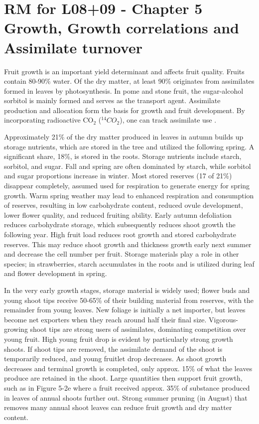 \section{RM for L08+09 - Chapter 5 Growth, Growth correlations and Assimilate turnover}

Fruit growth is an important yield determinant and affects fruit quality. Fruits contain 80-90\% water. Of the dry matter, at least 90\% originates from assimilates formed in leaves by photosynthesis. In pome and stone fruit, the sugar-alcohol sorbitol is mainly formed and serves as the transport agent. Assimilate production and allocation form the basis for growth and fruit development. By incorporating radioactive CO$_2$ ($^{14}CO_2$), one can track assimilate use \cite*{rm_06_L08_growth}.

\vspace{0.5em}
Approximately 21\% of the dry matter produced in leaves in autumn builds up storage nutrients, which are stored in the tree and utilized the following spring. A significant share, 18\%, is stored in the roots. Storage nutrients include starch, sorbitol, and sugar. Fall and spring are often dominated by starch, while sorbitol and sugar proportions increase in winter. Most stored reserves (17 of 21\%) disappear completely, assumed used for respiration to generate energy for spring growth. Warm spring weather may lead to enhanced respiration and consumption of reserves, resulting in low carbohydrate content, reduced ovule development, lower flower quality, and reduced fruiting ability. Early autumn defoliation reduces carbohydrate storage, which subsequently reduces shoot growth the following year. High fruit load reduces root growth and stored carbohydrate reserves. This may reduce shoot growth and thickness growth early next summer and decrease the cell number per fruit. Storage materials play a role in other species; in strawberries, starch accumulates in the roots and is utilized during leaf and flower development in spring.

\vspace{0.5em}
In the very early growth stages, storage material is widely used; flower buds and young shoot tips receive 50-65\% of their building material from reserves, with the remainder from young leaves. New foliage is initially a net importer, but leaves become net exporters when they reach around half their final size. Vigorous-growing shoot tips are strong users of assimilates, dominating competition over young fruit. High young fruit drop is evident by particularly strong growth shoots. If shoot tips are removed, the assimilate demand of the shoot is temporarily reduced, and young fruitlet drop decreases. As shoot growth decreases and terminal growth is completed, only approx. 15\% of what the leaves produce are retained in the shoot. Large quantities then support fruit growth, such as in Figure 5-2e where a fruit received approx. 35\% of substance produced in leaves of annual shoots further out. Strong summer pruning (in August) that removes many annual shoot leaves can reduce fruit growth and dry matter content.


